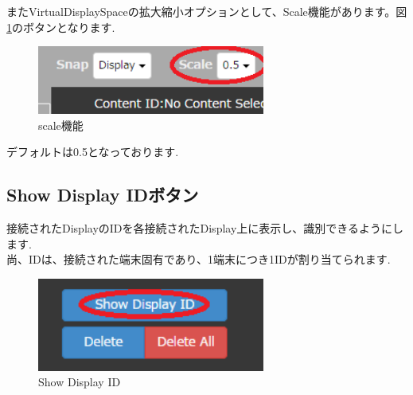 \documentclass[a4paper,10pt,oneside]{jsbook}
\begin{document}
またVirtualDisplaySpaceの拡大縮小オプションとして、Scale機能があります。図\ref{fig:scale}のボタンとなります.\\

\begin{figure}[htbp]
	\begin{center}
		\includegraphics[width=7.5cm]{image/MIGIUE_Scale.PNG}
	\end{center}
	\caption{scale機能}
	\label{fig:scale}
\end{figure}

デフォルトは0.5となっております.\\



\clearpage 


\subsection{Show Display IDボタン}
接続されたDisplayのIDを各接続されたDisplay上に表示し、識別できるようにします.\\
尚、IDは、接続された端末固有であり、1端末につき1IDが割り当てられます.\\
\begin{figure}[htbp]
	\begin{center}
		\includegraphics[width=7.5cm]{image/3Button1.PNG}
	\end{center}
	\caption{Show Display ID}
	\label{fig:showdisplayid}
\end{figure}


\end{document}

